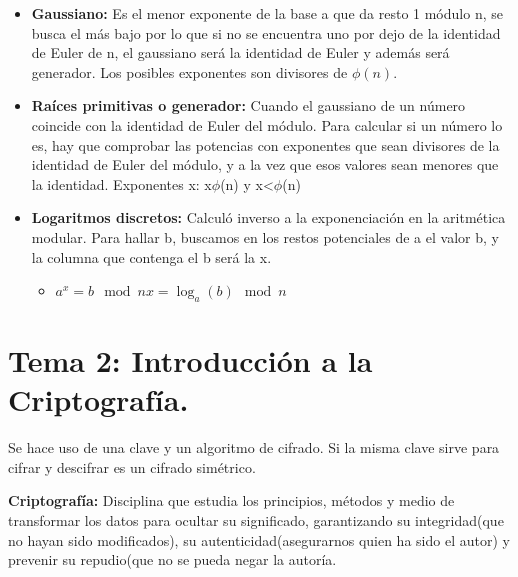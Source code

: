 \documentclass[12pt, twoside, openright]{report} %
\begin{document}
\begin{itemize}
  \item \textbf{Gaussiano:} Es el menor exponente de la base a que da resto
    1 módulo n, se busca el más bajo por lo que si no se encuentra uno
    por dejo de la identidad de Euler de n, el gaussiano será la
    identidad de Euler y además será generador. Los posibles exponentes
    son divisores de $\phi(n)$.
    
  \item \textbf{Raíces primitivas o generador:} Cuando el gaussiano de un
    número coincide con la identidad de Euler del módulo. Para calcular
    si un número lo es, hay que comprobar las potencias con exponentes
    que sean divisores de la identidad de Euler del módulo, y a la vez
    que esos valores sean menores que la identidad. Exponentes x:
    x\textbar $\phi$(n) y x\textless $\phi$(n)
    
  \item \textbf{Logaritmos discretos:} Calculó inverso a la exponenciación
    en la aritmética modular. Para hallar b, buscamos en los restos
    potenciales de a el valor b, y la columna que contenga el b será la
    x.
    

    \begin{itemize}
    \item
      
	  $a^x = b \mod n x=\log_a(b) \mod n$
      
    \end{itemize}
  \end{itemize}

  
\chapter{Tema 2: Introducción a la Criptografía.}

  Se hace uso de una clave y un algoritmo de cifrado. Si la misma clave
  sirve para cifrar y descifrar es un cifrado simétrico.
  
  \textbf{Criptografía:} Disciplina que estudia los principios, métodos
  y medio de transformar los datos para ocultar su significado,
  garantizando su integridad(que no hayan sido modificados), su
  autenticidad(asegurarnos quien ha sido el autor) y prevenir su
  repudio(que no se pueda negar la autoría.
  
\end{document}
